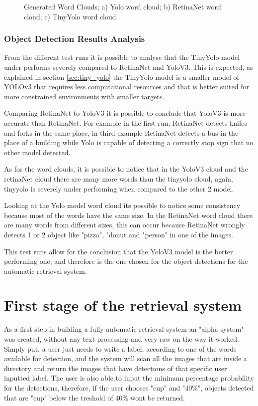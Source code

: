 \begin{figure}[H]
\begin{subfigure}{0.3\textwidth}
      \caption{}
      \end{subfigure}
      \caption{Generated Word Clouds; a) Yolo word cloud; b) RetinaNet word cloud; c) TinyYolo word cloud}
    \end{figure}

    \newpage
    

    \subsubsection{Object Detection Results Analysis}
      \label{sec:results_image_rec}


     From the different test runs it is possible to analyse that the TinyYolo model under performs severely compared to RetinaNet and YoloV3. This is expected, as explained in section \ref{sec:tiny_yolo} the TinyYolo model is a smaller model of YOLOv3 that requires less computational resources and that is better suited for more constrained environments with smaller targets.

     Comparing RetinaNet to YoloV3 it is possible to conclude that YoloV3 is more accurate than RetinaNet. For example in the first run, RetinaNet detects knifes and forks in the same place, in third example RetinaNet detects a bus in the place of a building while Yolo is capable of detecting a correctly stop sign that no other model detected.

     As for the word clouds, it is possible to notice that in the YoloV3 cloud and the retinaNet cloud there are many more words than the tinyyolo cloud, again, tinyyolo is severely under performing when compared to the other 2 model.
     
     Looking at the Yolo model word cloud its possible to notice some consistency because most of the words have the same size. In the RetinaNet word cloud there are many words from different sizes, this can occur because RetinaNet wrongly detects 1 or 2 object like "pizza", "donut and "person" in one of the images.

     This test runs allow for the conclusion that the YoloV3 model is the better performing one, and therefore is the one chosen for the object detections for the automatic retrieval system. 


\section{First stage of the retrieval system}

As a first step in building a fully automatic retrieval system an "alpha system" was created, without any text processing and very raw on the way it worked. Simply put, a user just needs to write a label, according to one of the words available for detection, and the system will scan all the images that are inside a directory and return the images that have detections of that specific user inputted label. The user is also able to input the minimum percentage probability for the detections, therefore, if the user chooses "cup" and "40\%", objects detected that are "cup" below the treshold of 40\% wont be returned.

